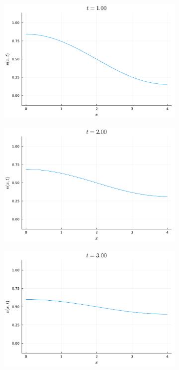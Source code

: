 \documentclass{article}
\begin{document}
\begin{figure}[H]
	\centering
	\begin{subfigure}{0.3\linewidth}
		\centering
		\includegraphics[width=\linewidth]{prob3_t=1.pdf}
	\end{subfigure}
	\begin{subfigure}{0.3\linewidth}
		\centering
		\includegraphics[width=\linewidth]{prob3_t=2.pdf}
	\end{subfigure}
	\begin{subfigure}{0.3\linewidth}
		\centering
		\includegraphics[width=\linewidth]{prob3_t=3.pdf}

\end{subfigure}
\end{figure}
\end{document}
